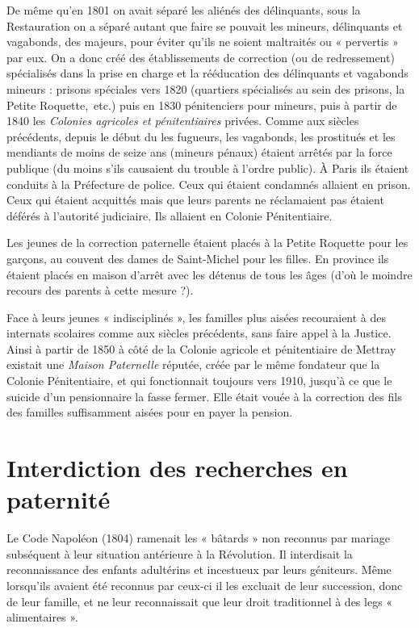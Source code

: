  De même qu'en 1801 on avait séparé les aliénés des délinquants, sous la Restauration on a séparé autant que faire se pouvait les mineurs, délinquants et vagabonds, des majeurs, pour éviter qu'ils ne soient maltraités ou « pervertis » par eux. On a donc créé des établissements de correction (ou de redressement) spécialisés dans la prise en charge et la rééducation des délinquants et vagabonds mineurs : prisons spéciales vers 1820 (quartiers spécialisés au sein des prisons, la Petite Roquette,~etc.) puis en 1830 pénitenciers pour mineurs, puis à partir de 1840 les \emph{Colonies agricoles et pénitentiaires} privées. Comme aux siècles précédents, depuis le début du  les fugueurs, les vagabonds, les prostitués et les mendiants de moins de seize ans (mineurs pénaux) étaient arrêtés par la force publique (du moins s'ils causaient du trouble à l'ordre public). À Paris ils étaient conduits à la Préfecture de police. Ceux qui étaient condamnés allaient en prison. Ceux qui étaient acquittés mais que leurs parents ne réclamaient pas étaient déférés à l'autorité judiciaire. Ils allaient en Colonie Pénitentiaire.

 Les jeunes de la correction paternelle étaient placés à la Petite Roquette pour les garçons, au couvent des dames de Saint-Michel pour les filles. En province ils étaient placés en maison d'arrêt avec les détenus de tous les âges (d'où le moindre recours des parents à cette mesure ?). 

 Face à leurs jeunes « indisciplinés », les familles plus aisées recouraient à des internats scolaires comme aux siècles précédents, sans faire appel à la Justice. Ainsi à partir de 1850 à côté de la Colonie agricole et pénitentiaire de Mettray existait une \emph{Maison Paternelle} réputée, créée par le même fondateur que la Colonie Pénitentiaire, et qui fonctionnait toujours vers 1910, jusqu'à ce que le suicide d'un pensionnaire la fasse fermer. Elle était vouée à la correction des fils des familles suffisamment aisées pour en payer la pension.

\section{Interdiction des recherches en paternité}

 Le Code Napoléon (1804) ramenait les « bâtards » non reconnus par mariage subséquent à leur situation antérieure à la Révolution. Il interdisait la reconnaissance des enfants adultérins et incestueux par leurs géniteurs. Même lorsqu'ils avaient été reconnus par ceux-ci il les excluait de leur succession, donc de leur famille, et ne leur reconnaissait que leur droit traditionnel à des legs « alimentaires ». 

